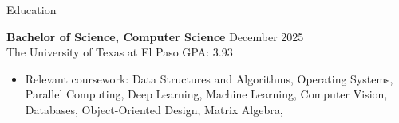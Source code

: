 \documentclass{resume} %
\begin{document}
\introduction[
    fullname=Ashkan Arabi,
    phone=(915) 888 - 9801,
    email=aarabimian@miners.utep.edu,
    linkedin=/in/ashkan-arabi,
    github=github.com/AshkanArabim,
]


\begin{workSection}{Education}

	\textbf{Bachelor of Science, Computer Science} \hfill {December 2025} \\
	The University of Texas at El Paso \hfill GPA: 3.93 \\
	\begin{itemize}
		\vspace{-1.8em}
		\itemsep -6pt {}
		\item Relevant coursework: 
			Data Structures and Algorithms{,} %
			Operating Systems{,}
			Parallel Computing{,} 
			Deep Learning{,} 
			Machine Learning{,} 
			Computer Vision{,} 
			Databases{,}
			Object-Oriented Design{,} 
			Matrix Algebra{,}
	\end{itemize}
\end{workSection}
\end{document}
